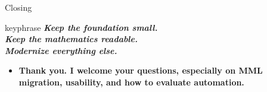 \documentclass[aspectratio=169,11pt]{beamer}
\begin{document}
\begin{frame}[fragile,t]{Closing}
\begin{center}
\begin{beamercolorbox}[rounded=true,sep=2.5mm,wd=0.9\textwidth]{keyphrase}
\centering\itshape \textcolor{blue!55!black}{\textbf{Keep the foundation small.}}\\ \textcolor{blue!55!black}{\textbf{Keep the mathematics readable.}}\\ \textcolor{blue!55!black}{\textbf{Modernize everything else.}}
\end{beamercolorbox}
\end{center}
\begin{itemize}
\setlength{\itemsep}{1pt}
\setlength{\parsep}{0pt}
\setlength{\parskip}{0pt}
\item \textcolor{blue!55!black}{\textbf{Thank you. I welcome your questions, especially on MML migration, usability, and how to evaluate automation.}}
\end{itemize}
\end{frame}

\appendix
\end{document}
